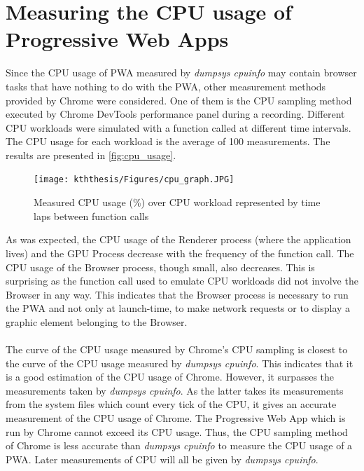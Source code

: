 \documentclass{kththesis}
\begin{document}
\section{Measuring the CPU usage of Progressive Web Apps}
\label{results:cpu}
Since the CPU usage of PWA measured by \textit{dumpsys cpuinfo} may contain browser tasks that have nothing to do with the PWA, other measurement methods provided by Chrome were considered. One of them is the CPU sampling method executed by Chrome DevTools performance panel during a recording. 
Different CPU workloads were simulated with a function called at different time intervals. The CPU usage for each workload is the average of 100 measurements. The results are presented in \autoref{fig:cpu_usage}.

\begin{figure}[h]
    \centering
    \texttt{[image: kththesis/Figures/cpu\_graph.JPG]}
    \caption[Measurements of CPU Usage of PWA]{Measured CPU usage (\%) over CPU workload represented by time laps between function calls}
    \label{fig:cpu_usage}
\end{figure}

As was expected, the CPU usage of the Renderer process (where the application lives) and the GPU Process decrease with the frequency of the function call. The CPU usage of the Browser process, though small, also decreases. This is surprising as the function call used to emulate CPU workloads did not involve the Browser in any way. This indicates that the Browser process is necessary to run the PWA and not only at launch-time, to make network requests or to display a graphic element belonging to the Browser.

\paragraph{}
The curve of the CPU usage measured by Chrome's CPU sampling is closest to the curve of the CPU usage measured by \textit{dumpsys cpuinfo}. This indicates that it is a good estimation of the CPU usage of Chrome. However, it surpasses the measurements taken by \textit{dumpsys cpuinfo}. As the latter takes its measurements from the system files which count every tick of the CPU, it gives an accurate measurement of the CPU usage of Chrome. The Progressive Web App which is run by Chrome cannot exceed its CPU usage. Thus, the CPU sampling method of Chrome is less accurate than \textit{dumpsys cpuinfo} to measure the CPU usage of a PWA. Later measurements of CPU will all be given by \textit{dumpsys cpuinfo}.
\end{document}
